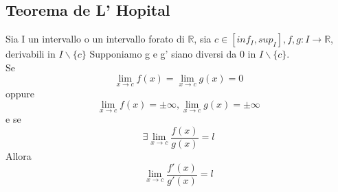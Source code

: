 \subsection{Teorema de L' Hopital}
Sia I un intervallo o un intervallo forato di $\mathbb{R}$, sia  \(c \in [inf_I, sup_I], f, g : I \rightarrow \mathbb{R}\), derivabili in \(I \backslash \{c\} \)
Supponiamo g e g' siano diversi da 0 in \(I \backslash \{c\} \). \\ 
Se 
\begin{equation*}
    \lim_{x \rightarrow c} f(x)= \lim_{x \rightarrow c} g(x)= 0
\end{equation*}
oppure 
\begin{equation*}
    \lim_{x \rightarrow c} f(x) =  \pm \infty,  \lim_{x \rightarrow c} g(x)=  \pm \infty
\end{equation*}
e se 
\begin{equation*}
    \exists \lim_{x \rightarrow c}  \displaystyle\frac{f(x)}{g(x)} = l
\end{equation*}
Allora 
\begin{equation*}
    \lim_{x \rightarrow c}  \displaystyle\frac{f'(x)}{g'(x)} = l
\end{equation*}
